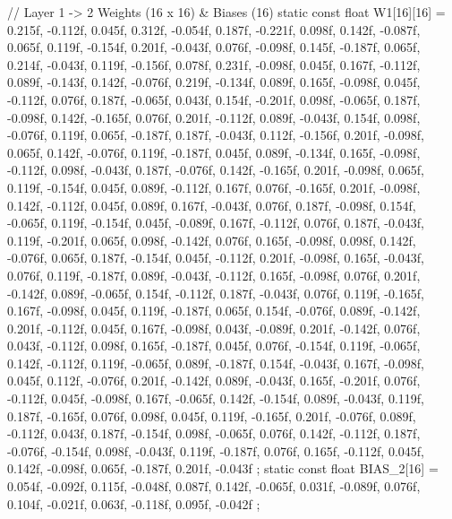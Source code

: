 \begin{cppbox}
{    // Layer 1 -> 2 Weights (16 x 16) & Biases (16)
    static const float W1[16][16] = {
        {0.215f, -0.112f, 0.045f, 0.312f, -0.054f, 0.187f, -0.221f, 0.098f, 0.142f, -0.087f, 0.065f, 0.119f, -0.154f, 0.201f, -0.043f, 0.076f},
        {-0.098f, 0.145f, -0.187f, 0.065f, 0.214f, -0.043f, 0.119f, -0.156f, 0.078f, 0.231f, -0.098f, 0.045f, 0.167f, -0.112f, 0.089f, -0.143f},
        {0.142f, -0.076f, 0.219f, -0.134f, 0.089f, 0.165f, -0.098f, 0.045f, -0.112f, 0.076f, 0.187f, -0.065f, 0.043f, 0.154f, -0.201f, 0.098f},
        {-0.065f, 0.187f, -0.098f, 0.142f, -0.165f, 0.076f, 0.201f, -0.112f, 0.089f, -0.043f, 0.154f, 0.098f, -0.076f, 0.119f, 0.065f, -0.187f},
        {0.187f, -0.043f, 0.112f, -0.156f, 0.201f, -0.098f, 0.065f, 0.142f, -0.076f, 0.119f, -0.187f, 0.045f, 0.089f, -0.134f, 0.165f, -0.098f},
        {-0.112f, 0.098f, -0.043f, 0.187f, -0.076f, 0.142f, -0.165f, 0.201f, -0.098f, 0.065f, 0.119f, -0.154f, 0.045f, 0.089f, -0.112f, 0.167f},
        {0.076f, -0.165f, 0.201f, -0.098f, 0.142f, -0.112f, 0.045f, 0.089f, 0.167f, -0.043f, 0.076f, 0.187f, -0.098f, 0.154f, -0.065f, 0.119f},
        {-0.154f, 0.045f, -0.089f, 0.167f, -0.112f, 0.076f, 0.187f, -0.043f, 0.119f, -0.201f, 0.065f, 0.098f, -0.142f, 0.076f, 0.165f, -0.098f},
        {0.098f, 0.142f, -0.076f, 0.065f, 0.187f, -0.154f, 0.045f, -0.112f, 0.201f, -0.098f, 0.165f, -0.043f, 0.076f, 0.119f, -0.187f, 0.089f},
        {-0.043f, -0.112f, 0.165f, -0.098f, 0.076f, 0.201f, -0.142f, 0.089f, -0.065f, 0.154f, -0.112f, 0.187f, -0.043f, 0.076f, 0.119f, -0.165f},
        {0.167f, -0.098f, 0.045f, 0.119f, -0.187f, 0.065f, 0.154f, -0.076f, 0.089f, -0.142f, 0.201f, -0.112f, 0.045f, 0.167f, -0.098f, 0.043f},
        {-0.089f, 0.201f, -0.142f, 0.076f, 0.043f, -0.112f, 0.098f, 0.165f, -0.187f, 0.045f, 0.076f, -0.154f, 0.119f, -0.065f, 0.142f, -0.112f},
        {0.119f, -0.065f, 0.089f, -0.187f, 0.154f, -0.043f, 0.167f, -0.098f, 0.045f, 0.112f, -0.076f, 0.201f, -0.142f, 0.089f, -0.043f, 0.165f},
        {-0.201f, 0.076f, -0.112f, 0.045f, -0.098f, 0.167f, -0.065f, 0.142f, -0.154f, 0.089f, -0.043f, 0.119f, 0.187f, -0.165f, 0.076f, 0.098f},
        {0.045f, 0.119f, -0.165f, 0.201f, -0.076f, 0.089f, -0.112f, 0.043f, 0.187f, -0.154f, 0.098f, -0.065f, 0.076f, 0.142f, -0.112f, 0.187f},
        {-0.076f, -0.154f, 0.098f, -0.043f, 0.119f, -0.187f, 0.076f, 0.165f, -0.112f, 0.045f, 0.142f, -0.098f, 0.065f, -0.187f, 0.201f, -0.043f}
    };
    static const float BIAS_2[16] = {
        0.054f, -0.092f, 0.115f, -0.048f, 0.087f, 0.142f, -0.065f, 0.031f,
        -0.089f, 0.076f, 0.104f, -0.021f, 0.063f, -0.118f, 0.095f, -0.042f
    };

}
\end{cppbox}
